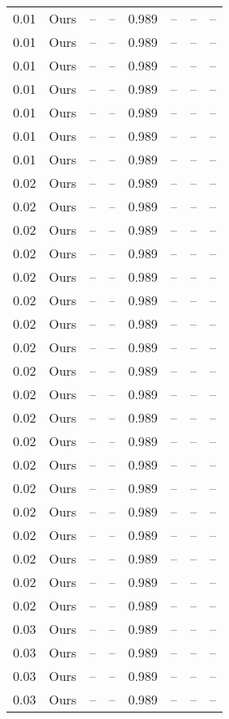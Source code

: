 \begin{table}[H]
\begin{tabular}{l c l l l}
0.01 & Ours & -- & -- & 0.989 & -- & -- & -- \\
0.01 & Ours & -- & -- & 0.989 & -- & -- & -- \\
0.01 & Ours & -- & -- & 0.989 & -- & -- & -- \\
0.01 & Ours & -- & -- & 0.989 & -- & -- & -- \\
0.01 & Ours & -- & -- & 0.989 & -- & -- & -- \\
0.01 & Ours & -- & -- & 0.989 & -- & -- & -- \\
0.01 & Ours & -- & -- & 0.989 & -- & -- & -- \\
0.02 & Ours & -- & -- & 0.989 & -- & -- & -- \\
0.02 & Ours & -- & -- & 0.989 & -- & -- & -- \\
0.02 & Ours & -- & -- & 0.989 & -- & -- & -- \\
0.02 & Ours & -- & -- & 0.989 & -- & -- & -- \\
0.02 & Ours & -- & -- & 0.989 & -- & -- & -- \\
0.02 & Ours & -- & -- & 0.989 & -- & -- & -- \\
0.02 & Ours & -- & -- & 0.989 & -- & -- & -- \\
0.02 & Ours & -- & -- & 0.989 & -- & -- & -- \\
0.02 & Ours & -- & -- & 0.989 & -- & -- & -- \\
0.02 & Ours & -- & -- & 0.989 & -- & -- & -- \\
0.02 & Ours & -- & -- & 0.989 & -- & -- & -- \\
0.02 & Ours & -- & -- & 0.989 & -- & -- & -- \\
0.02 & Ours & -- & -- & 0.989 & -- & -- & -- \\
0.02 & Ours & -- & -- & 0.989 & -- & -- & -- \\
0.02 & Ours & -- & -- & 0.989 & -- & -- & -- \\
0.02 & Ours & -- & -- & 0.989 & -- & -- & -- \\
0.02 & Ours & -- & -- & 0.989 & -- & -- & -- \\
0.02 & Ours & -- & -- & 0.989 & -- & -- & -- \\
0.02 & Ours & -- & -- & 0.989 & -- & -- & -- \\
0.03 & Ours & -- & -- & 0.989 & -- & -- & -- \\
0.03 & Ours & -- & -- & 0.989 & -- & -- & -- \\
0.03 & Ours & -- & -- & 0.989 & -- & -- & -- \\
0.03 & Ours & -- & -- & 0.989 & -- & -- & -- \\

\end{tabular}
\end{table}
